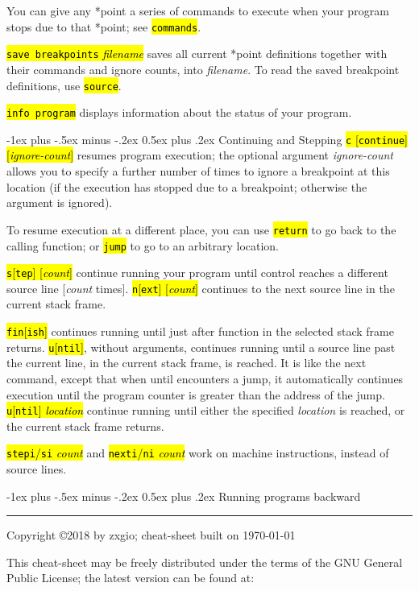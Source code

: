 \documentclass[a4paper,landscape]{article}
\makeatletter
\renewcommand{\section}{\@startsection{section}{1}{0mm}%
                                {-1ex plus -.5ex minus -.2ex}%
                                {0.5ex plus .2ex}%
                                {\normalfont\large\bfseries}}
\makeatother
\begin{document}
\begin{multicols*}{3}
You can give any *point a series of commands to execute
when your program stops due to that *point; see \hl{\texttt{commands}}.

\hl{\texttt{save breakpoints} \textit{filename}} saves all current *point definitions together with their commands and ignore counts, into \textit{filename}.
To read the saved breakpoint definitions, use \hl{\texttt{source}}.

\hl{\texttt{info program}} displays information about the status of your program.

\section{Continuing and Stepping}
\hl{\texttt{c} [\texttt{continue}] [\textit{ignore-count}]}
resumes program execution; the optional argument
\textit{ignore-count} allows you to specify a further number of times to ignore a breakpoint at this location (if the execution has stopped due to a breakpoint; otherwise the argument is ignored).

To resume execution at a different place, you can use \hl{\texttt{return}} to go back to the
calling function; or \hl{\texttt{jump}} to go to an arbitrary location.

\hl{\texttt{s}[\texttt{tep}] [\textit{count}]} continue running your program until control reaches a different source line [\textit{count} times]. \hl{\texttt{n}[\texttt{ext}] [\textit{count}]} continues to the next source line in the current stack frame.

\hl{\texttt{fin}[\texttt{ish}]} continues running until just after function in the selected stack frame returns.
\hl{\texttt{u}[\texttt{ntil}]}, without arguments, continues running until a source line past the current line, in the current stack frame, is reached. It is like the next command, except that when until encounters a jump, it automatically continues execution until the program counter is greater than the address of the jump. \hl{\texttt{u}[\texttt{ntil}] \textit{location}} continue running until either the specified \textit{location} is reached, or the current stack frame returns.

\hl{\texttt{stepi}/\texttt{si} \textit{count}} and \hl{\texttt{nexti}/\texttt{ni} \textit{count}} work on machine instructions, instead of source lines.

\section{Running programs backward}

\rule{1.0\linewidth}{0.25pt}
\scriptsize
Copyright \copyright 2018 by zxgio; cheat-sheet built on \today

This cheat-sheet may be freely distributed under the terms of the GNU
General Public License; the latest version can be found at: \\
\end{multicols*}
\end{document}
